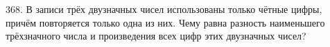 368. В записи трёх двузначных чисел использованы только чётные цифры, причём повторяется только одна из них. Чему равна разность наименьшего
трёхзначного числа и произведения всех цифр этих двузначных чисел?\\
